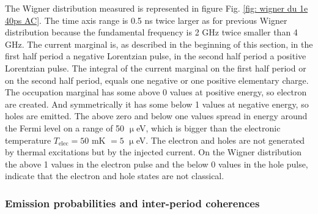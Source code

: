 The Wigner distribution measured is represented in figure Fig. \ref{fig: wigner du 1e 40ps AC}.
The time axis range is 0.5 ns twice larger as for previous Wigner distribution because the fundamental frequency is 2 GHz twice smaller than 4 GHz.
The current marginal is, as described in the beginning of this section, in the first half period a negative Lorentzian pulse, in the second half period a positive Lorentzian pulse.
The integral of the current marginal on the first half period or on the second half period, equals one negative or one positive elementary charge.
The occupation marginal has some above 0 values at positive energy, so electron are created.
And symmetrically it has some below 1 values at negative energy, so holes are emitted.
The above zero and below one values spread in energy around the Fermi level on a range of 50 $\upmu$eV, which is bigger than the electronic temperature $T_{\mathrm{elec}} = 50$ mK $= 5$ $\upmu$eV.
The electron and holes are not generated by thermal excitations but by the injected current.
On the Wigner distribution the above 1 values in the electron pulse and the below 0 values in the hole pulse, indicate that the electron and hole states are not classical.


\subsubsection*{Emission probabilities and inter-period coherences}

